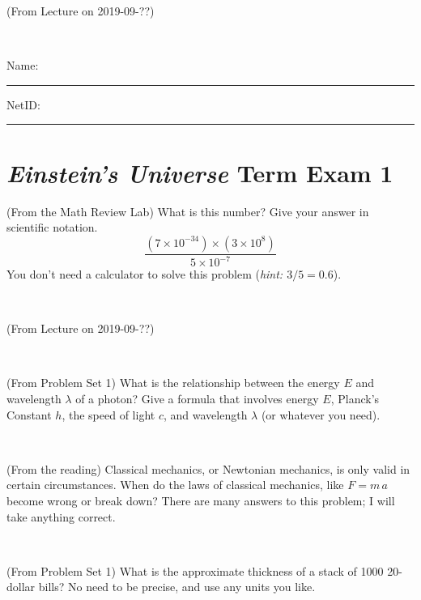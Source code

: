 \documentclass[12pt, letterpaper]{article}
\begin{document}
\begin{problem} (From Lecture on 2019-09-??)
\end{problem}


\vfill ~


\cleardoublepage



\noindent
Name: \rule[-1ex]{0.60\textwidth}{0.1pt}
NetID: \rule[-1ex]{0.20\textwidth}{0.1pt}

\section*{\textsl{Einstein's Universe} Term Exam 1}
\setcounter{problem}{1}


\begin{problem} (From the Math Review Lab)
What is this number? Give your answer in scientific notation.
$$
\frac{(7\times10^{-34})\times(3\times10^8)}{5\times10^{-7}}
$$
You don't need a calculator to solve this problem (\textit{hint: $3/5=0.6$}).
\end{problem}


\vfill ~

\begin{problem} (From Lecture on 2019-09-??)
\end{problem}


\vfill ~

\begin{problem} (From Problem Set 1)
What is the relationship between the energy $E$ and wavelength
$\lambda$ of a photon? Give a formula that involves energy $E$,
Planck's Constant $h$, the speed of light $c$, and wavelength
$\lambda$ (or whatever you need).
\end{problem}

\vfill ~

\begin{problem} (From the reading)
Classical mechanics, or Newtonian mechanics, is only valid in certain
circumstances. When do the laws of classical mechanics, like $F =
m\,a$ become wrong or break down? There are many answers to this
problem; I will take anything correct.
\end{problem}


\vfill ~


\clearpage


\begin{problem} (From Problem Set 1)
What is the approximate thickness of a stack of 1000 20-dollar bills?
No need to be precise, and use any units you like.
\end{problem}
\end{document}
